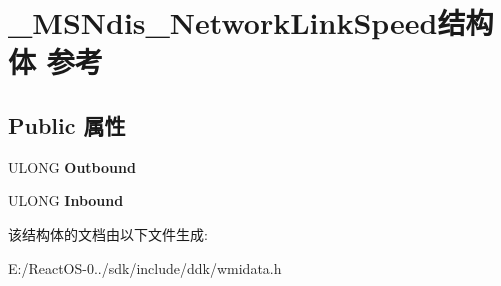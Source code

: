 \hypertarget{struct___m_s_ndis___network_link_speed}{}\section{\+\_\+\+M\+S\+Ndis\+\_\+\+Network\+Link\+Speed结构体 参考}
\label{struct___m_s_ndis___network_link_speed}
\subsection*{Public 属性}
\begin{DoxyCompactItemize}
\item 
\mbox{\label{struct___m_s_ndis___network_link_speed_aab53c899474989163207db5b3dd2bfa5}} 
U\+L\+O\+NG {\bfseries Outbound}
\item 
\mbox{\label{struct___m_s_ndis___network_link_speed_a04391639b82c1879379b23babbe5e839}} 
U\+L\+O\+NG {\bfseries Inbound}
\end{DoxyCompactItemize}


该结构体的文档由以下文件生成\+:\begin{DoxyCompactItemize}
\item 
E\+:/\+React\+O\+S-\/0../sdk/include/ddk/wmidata.\+h\end{DoxyCompactItemize}
